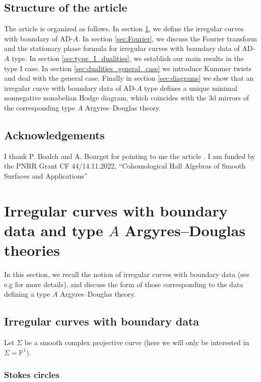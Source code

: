 \documentclass[11pt,a4paper]{amsart}
\numberwithin{equation}{section}
\begin{document}
\subsection*{Structure of the article} The article is organized as follows. In section \ref{sec:irreg_curves}, we define the irregular curves with boundary of AD-$A$. In section \ref{sec:Fourier}, we discuss the Fourier transform and the stationary phase formula for irregular curves with boundary data of AD-$A$ type. In section \ref{sec:type_I_dualities}, we establish our main results in the type I case. In section \ref{sec:dualities_general_case} we introduce Kummer twists and deal with the general case. Finally in section \ref{sec:diagrams} we show that an irregular curve with boundary data of AD-$A$ type defines a unique minimal nonnegative nonabelian Hodge diagram, which coincides with the 3d mirrors of the corresponding type $A$ Argyres--Douglas theory.

\subsection*{Acknowledgements}  I thank P. Boalch and A. Bourget for pointing to me the article \cite{beem2025simplifying}. I am funded by the PNRR Grant CF 44/14.11.2022, ``Cohomological Hall Algebras of Smooth Surfaces and Applications''




\section{Irregular curves with boundary data and type $A$ Argyres--Douglas theories}
\label{sec:irreg_curves}

In this section, we recall the notion of irregular curves with boundary data (see e.g \cite{boalch2021topology, boalch2025twisted} for more details), and discuss the form of those corresponding to the data defining a type $A$ Argyres--Douglas theory. 

\subsection{Irregular curves with boundary data}

Let $\Sigma$ be a smooth complex projective curve (here we will only be interested in $\Sigma=\mathbb P^1$).


\subsubsection{Stokes circles}
\end{document}
